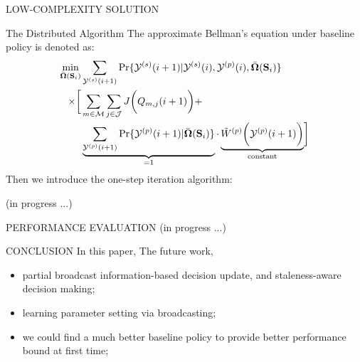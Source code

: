 \documentclass[10pt, conference, letterpaper]{IEEEtran}
\renewcommand{\vec}{\mathbf}
\DeclarePairedDelimiter{\Paren}{\bigg(}{\bigg)}
\DeclarePairedDelimiter{\Bracket}{\bigg[}{\bigg]}
\newcommand{\esSet}{\mathcal{M}}
\newcommand{\jSpace}{\mathcal{J}}
\newcommand{\Stat}{\mathbf{S}}
\newcommand{\Obsv}{\mathcal{Y}}
\newcommand{\Policy}{\boldsymbol{\Omega}}
\newcommand{\BPolicy}{\bar{\Policy}}
\begin{document}
\begin{section}{LOW-COMPLEXITY SOLUTION}
        \begin{subsection}{The Distributed Algorithm}
            The approximate Bellman's equation under baseline policy is denoted as:
            \begin{align}
                \min_{\BPolicy(\Stat_i)}& \sum_{\Obsv^{(s)}(i+1)} \Pr\{\Obsv^{(s)}(i+1)|\Obsv^{(s)}(i), \Obsv^{(p)}(i), \BPolicy(\Stat_i)\}
                \nonumber\\
                \times \Bracket{
                    & \sum_{m\in\esSet}\sum_{j\in\jSpace} J\Paren{Q_{m,j}(i+1)}
                    +
                    \nonumber\\
                    & \underbrace{\sum_{\Obsv^{(p)}(i+1)} \Pr\{\Obsv^{(p)}(i+1)|\BPolicy(\Stat_i)\}}_{\text{=1}}
                    \cdot \underbrace{\tilde{W}^{(p)} \Paren{\Obsv^{(p)}(i+1)}}_{\text{constant}}
                } 
            \end{align}
            Then we introduce the one-step iteration algorithm:
            \begin{algorithm}[H]
                \caption{Distributed Algorithm for $k$-th AP}
                \begin{algorithmic}
                    \WHILE{\TRUE}
                        \STATE (in progress ...)
                    \ENDWHILE
                \end{algorithmic}
            \end{algorithm}
        \end{subsection}
        
    \end{section}

    \begin{section}{PERFORMANCE EVALUATION}
        \label{sec:evaluation}
        (in progress ...)
    \end{section}

    \begin{section}{CONCLUSION}
        \label{sec:conclusion}
        In this paper,
        The future work,
        \begin{itemize}
            \item partial broadcast information-based decision update, and staleness-aware decision making;
            \item learning parameter setting via broadcasting;
            \item we could find a much better baseline policy to provide better performance bound at first time;
        \end{itemize}
    \end{section}
    
\end{document}
